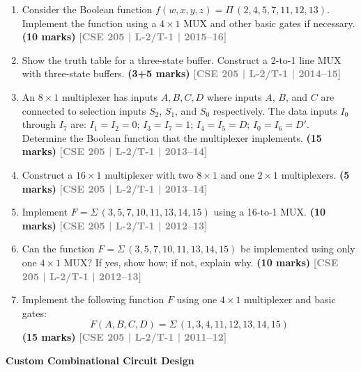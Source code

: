 \documentclass[12pt,a3paper]{article}
\newcommand{\yr}[1]{\hfill\textcolor{gray}{\small\textbf{[#1]}}}
\newcommand{\mk}[1]{\textcolor{orange!70!black}{\small\textbf{(#1 marks)}}}
\newcommand{\subtopic}[2]{%
  \vspace{10pt}
  \noindent\begin{tcolorbox}[colback=#1!8,colframe=#1,boxrule=0.6pt,arc=4pt,
    left=6pt,right=6pt,top=4pt,bottom=4pt]
    \small\bfseries\textcolor{#1}{#2}
  \end{tcolorbox}
  \vspace{2pt}
}
\begin{document}
\begin{enumerate}
\item Consider the Boolean function $f(w, x, y, z) = \Pi\,(2,4,5,7,11,12,13)$. Implement the function using a $4 \times 1$ MUX and other basic gates if necessary.
\mk{10} \yr{CSE 205 | L-2/T-1 | 2015--16}


\item Show the truth table for a three-state buffer. Construct a 2-to-1 line MUX with three-state buffers.
\mk{3+5} \yr{CSE 205 | L-2/T-1 | 2014--15}


\item An $8 \times 1$ multiplexer has inputs $A, B, C, D$ where inputs $A$, $B$, and $C$ are connected to selection inputs $S_2$, $S_1$, and $S_0$ respectively. The data inputs $I_0$ through $I_7$ are: $I_1 = I_2 = 0$; $I_3 = I_7 = 1$; $I_4 = I_5 = D$; $I_0 = I_6 = D'$. Determine the Boolean function that the multiplexer implements.
\mk{15} \yr{CSE 205 | L-2/T-1 | 2013--14}

\item Construct a $16 \times 1$ multiplexer with two $8 \times 1$ and one $2 \times 1$ multiplexers.
\mk{5} \yr{CSE 205 | L-2/T-1 | 2013--14}


\item Implement $F = \Sigma\,(3,5,7,10,11,13,14,15)$ using a 16-to-1 MUX.
\mk{10} \yr{CSE 205 | L-2/T-1 | 2012--13}

\item Can the function $F = \Sigma\,(3,5,7,10,11,13,14,15)$ be implemented using only one $4 \times 1$ MUX? If yes, show how; if not, explain why.
\mk{10} \yr{CSE 205 | L-2/T-1 | 2012--13}

\item Implement the following function $F$ using one $4 \times 1$ multiplexer and basic gates:
\[ F(A,B,C,D) = \Sigma\,(1,3,4,11,12,13,14,15) \]
\mk{15} \yr{CSE 205 | L-2/T-1 | 2011--12}

\end{enumerate}

\subtopic{cD}{Custom Combinational Circuit Design}
\label{sub:s4-comb-custom}
\end{document}
